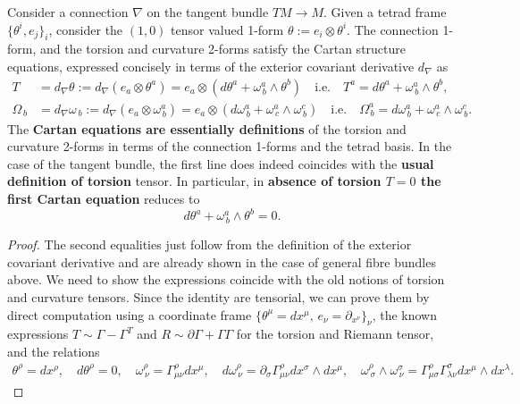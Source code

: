 \begin{mytheorem}
%
Consider a connection $\nabla$ on the tangent bundle $TM \to M$.
Given a tetrad frame $\{\theta^i,e_j\}_i$, consider the $(1,0)$ tensor valued 1-form $\theta :=  e_i \otimes \theta^i$.
The connection 1-form, and the torsion and curvature 2-forms satisfy the Cartan structure equations, expressed concisely in terms of the exterior covariant derivative $d_\nabla$ as
\begin{align}
    T &= d_\nabla \theta := d_\nabla (e_a\otimes \theta^a)= e_a \otimes \left(d \theta^a + \omega^a_{\, b} \wedge \theta^b \right) 
    \quad \text{i.e.} \quad T^a = d \theta^a + \omega^a_{\, b} \wedge \theta^b,
    \\
    \Omega_{\, b} &= d_\nabla \omega_{\, b}:=d_\nabla (e_a \otimes \omega^a_{\, b}) = e_a \otimes \left(d \omega^a_{\, b} + \omega^a_{\,c} \wedge \omega^c_{\, b}\right) 
    \quad\text{i.e.} \quad \Omega^a_{\, b} = d \omega^a_{\, b} + \omega^a_{\, c} \wedge \omega^c_{\, b}.
\end{align}
The \textbf{Cartan equations are essentially definitions} of the torsion and curvature 2-forms in terms of the connection 1-forms and the tetrad basis.
In the case of the tangent bundle, the first line does indeed coincides with the \textbf{usual definition of torsion} tensor.
In particular, in \textbf{absence of torsion $T=0$ the first Cartan equation} reduces to
\begin{equation}
    d \theta^a + \omega^a_{\, b} \wedge \theta^b = 0.
\end{equation}
\end{mytheorem}
\vspace{-4mm}
\begin{proof}
The second equalities just follow from the definition of the exterior covariant derivative and are already shown in the case of general fibre bundles above.
We need to show the expressions coincide with the old notions of torsion and curvature tensors.
Since the identity are tensorial, we can prove them by direct computation using a coordinate frame $\{\theta^\mu=dx^\mu,\, e_\nu=\partial_{x^\nu}\}_\nu$, the known expressions $T\sim \Gamma - \Gamma^T$ and $R\sim \partial \Gamma + \Gamma \Gamma$ for the torsion and Riemann tensor, and the relations
\begin{align}
    \theta^\rho = dx^\rho,\quad d\theta^\rho = 0,\quad
    \omega^\rho_{\, \nu} = \Gamma^\rho_{\mu \nu} dx^\mu,
    \quad
    d \omega^\rho_{\, \nu} = \partial_\sigma \Gamma^\rho_{\mu \nu} dx^\sigma \wedge dx^\mu,
    \quad
    \omega^\rho_{\, \sigma} \wedge \omega^\sigma_{\, \nu} = \Gamma^\rho_{\mu \sigma} \Gamma^\sigma_{\lambda \nu} dx^\mu \wedge dx^\lambda.
\end{align}
%
\end{proof}



